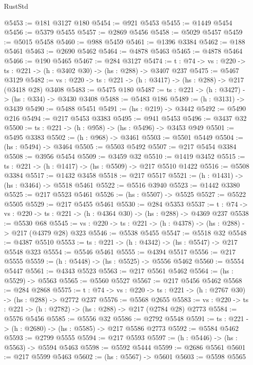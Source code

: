 \begin{lexlean}{RustStd}
\begin{coremodule}
@5453 := @181 @3127 @180
@5454 := @921 @5453
@5455 := @1449 @5454
@5456 := @5379 @5455
@5457 := @2869 @5456
@5458 := @5029 @5457
@5459 := @5015 @5458
@5460 := @988 @5459
@5461 := @1396 @3384
@5462 := @188 @5461
@5463 := @2690 @5462
@5464 := @4878 @5463
@5465 := @4878 @5464
@5466 := @190 @5465
@5467 := @284 @3127
@5474 := {t : @74} -> {vs : @220} -> {ts : @221} -> (h : @3402 @30) -> (hs : @288) -> @3407 @237
@5475 := @5467 @3129
@5482 := {vs : @220} -> {ts : @221} -> (h : @3417) -> (hs : @288) -> @217 (@3418 @28) @3408
@5483 := @5475 @180
@5487 := {ts : @221} -> (h : @3427) -> (hs : @334) -> @3430 @3408
@5488 := @5483 @186
@5489 := (h : @3131) -> @3439
@5490 := @5488 @5451
@5491 := (hs : @219) -> @3442
@5492 := @5490 @216
@5494 := @217 @5453 @3383
@5495 := @941 @5453
@5496 := @3437 @32
@5500 := {ts : @221} -> (h : @958) -> (hs : @5496) -> @3453 @949
@5501 := @5495 @3383
@5502 := (h : @968) -> @3461
@5503 := @5501 @5449
@5504 := (hs : @5494) -> @3464
@5505 := @5503 @5492
@5507 := @217 @5454 @3384
@5508 := @3956 @5454
@5509 := @3459 @32
@5510 := @1419 @3452
@5515 := {ts : @221} -> (h : @1417) -> (hs : @5509) -> @217 @5510 @1422
@5516 := @5508 @3384
@5517 := @1432 @3458
@5518 := @217 @5517
@5521 := (h : @1431) -> (hs : @3464) -> @5518 @5461
@5522 := @5516 @3940
@5523 := @1442 @3380
@5525 := @217 @5523 @5461
@5526 := (hs : @5507) -> @5525
@5527 := @5522 @5505
@5529 := @217 @5455 @5461
@5530 := @284 @5353
@5537 := {t : @74} -> {vs : @220} -> {ts : @221} -> (h : @4364 @30) -> (hs : @288) -> @4369 @237
@5538 := @5530 @68
@5545 := {vs : @220} -> {ts : @221} -> (h : @4378) -> (hs : @288) -> @217 (@4379 @28) @323
@5546 := @5538 @5455
@5547 := @5518 @32
@5548 := @4387 @5510
@5553 := {ts : @221} -> (h : @4342) -> (hs : @5547) -> @217 @5548 @323
@5554 := @5546 @5461
@5555 := @4394 @5517
@5556 := @217 @5555
@5559 := (h : @5448) -> (hs : @5525) -> @5556 @5462
@5560 := @5554 @5447
@5561 := @4343 @5523
@5563 := @217 @5561 @5462
@5564 := (hs : @5529) -> @5563
@5565 := @5560 @5527
@5567 := @217 @5456 @5462
@5568 := @284 @2868
@5575 := {t : @74} -> {vs : @220} -> {ts : @221} -> (h : @2767 @30) -> (hs : @288) -> @2772 @237
@5576 := @5568 @2655
@5583 := {vs : @220} -> {ts : @221} -> (h : @2782) -> (hs : @288) -> @217 (@2784 @28) @2773
@5584 := @5576 @5456
@5585 := @5556 @32
@5586 := @2792 @5548
@5591 := {ts : @221} -> (h : @2680) -> (hs : @5585) -> @217 @5586 @2773
@5592 := @5584 @5462
@5593 := @2799 @5555
@5594 := @217 @5593
@5597 := (h : @5446) -> (hs : @5563) -> @5594 @5463
@5598 := @5592 @5444
@5599 := @2686 @5561
@5601 := @217 @5599 @5463
@5602 := (hs : @5567) -> @5601
@5603 := @5598 @5565

\end{coremodule}
\end{lexlean}
